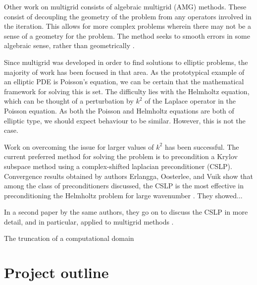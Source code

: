 Other work on multigrid consists of algebraic multigrid (AMG) methods.
These consist of decoupling the geometry of the problem from any operators involved in the iteration.
This allows for more complex problems wherein there may not be a sense of a geometry for the problem.
The method seeks to smooth errors in some algebraic sense, rather than geometrically \cite{briggs}.

Since multigrid was developed in order to find solutions to elliptic problems, the majority of work has been focused in that area.
As the prototypical example of an elliptic PDE is Poisson's equation, we can be certain that the mathematical framework for solving this is set.
The difficulty lies with the Helmholtz equation, which can be thought of a perturbation by $k^2$ of the Laplace operator in the Poisson equation.
As both the Poisson and Helmholtz equations are both of elliptic type, we should expect behaviour to be similar.
However, this is not the case.


Work on overcoming the issue for larger values of $k^2$ has been successful.
The current preferred method for solving the problem is to precondition a Krylov subspace method using a complex-shifted laplacian preconditioner (CSLP).
Convergence results obtained by authors Erlangga, Oosterlee, and Vuik show that among the class of preconditioners discussed, the CSLP is the most effective in preconditioning the Helmholtz problem for large wavenumber \cite{cslp1}.
They showed... %

In a second paper by the same authors, they go on to discuss the CSLP in more detail, and in particular, applied to multigrid methods \cite{cslp2}.



The truncation of a computational domain







\section{Project outline}

\iffalse
What is each chapter doing? What do we hope to accomplish? 
This entire chapter will need fleshing out/rewording depending on the scope of each chapter.
\fi

